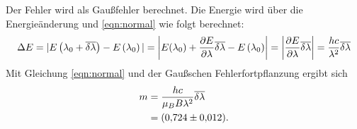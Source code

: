 Der Fehler wird als Gaußfehler berechnet.
Die Energie wird über die Energieänderung und \eqref{eqn:normal} wie folgt berechnet:
\begin{equation}
  \notag
  \Delta E = | E \left( \lambda_{0} + \overline{\delta \lambda} \right) - E \left( \lambda_{0} \right) |
           = \left| E( \lambda_{0}) + \frac{\partial E}{\partial \lambda}\overline{\delta \lambda} - E \left( \lambda_{0} \right) \right|
           = \left| \frac{\partial E}{\partial \lambda}\overline{\delta \lambda} \right|
           = \frac{h c}{ \lambda^2 } \overline{\delta \lambda }
           \label{eqn:energie}
\end{equation}
Mit Gleichung \eqref{eqn:normal} und der Gaußschen Fehlerfortpflanzung ergibt sich
\begin{align*}
  m &= \frac{h c}{\mu_B B \lambda^2 } \overline{\delta \lambda } \\
    &= \SI{0.724 \pm 0.012}{}.
\end{align*}

\FloatBarrier
